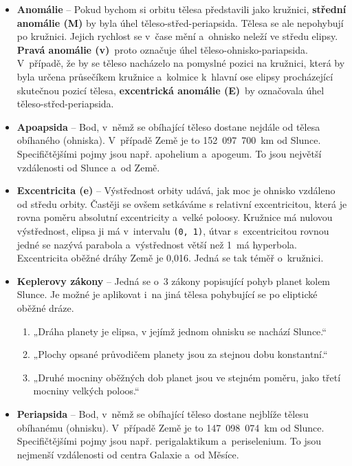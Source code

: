 \documentclass[a4paper,12pt]{article}
\def\code#1{\texttt{#1}}
\begin{document}

\begin{itemize}
\item \textbf{Anomálie} -- Pokud bychom si orbitu tělesa představili jako kružnici, \textbf{střední anomálie (M)} by byla úhel těleso-střed-periapsida. Tělesa se ale nepohybují po kružnici. Jejich rychlost se v~čase mění a~ohnisko neleží ve středu elipsy. \textbf{Pravá anomálie (v)}~proto označuje úhel těleso-ohnisko-pariapsida. V~případě, že by se těleso nacházelo na pomyslné pozici na kružnici, která by byla určena průsečíkem kružnice a~kolmice k~hlavní ose elipsy procházející skutečnou pozicí tělesa, \textbf{excentrická anomálie (E)}~by označovala úhel těleso-střed-periapsida.~\cite{kleczek}

\item \textbf{Apoapsida} -- Bod, v~němž se obíhající těleso dostane nejdále od tělesa obíhaného (ohniska). V~případě Země je to 152~097~700~km od Slunce. Specifičtějšími pojmy jsou např. apohelium a~apogeum. To jsou největší vzdálenosti od Slunce a~od Země.~\cite{kleczek}

\item \textbf{Excentricita (e)} -- Výstřednost orbity udává, jak moc je ohnisko vzdáleno od středu orbity. Častěji se ovšem setkáváme s relativní excentricitou, která je rovna poměru absolutní excentricity a~velké poloosy. Kružnice má nulovou výstřednost, elipsa ji má v~intervalu \code{(0,~1)}, útvar s~excentricitou rovnou jedné se nazývá parabola a~výstřednost větší než 1~má hyperbola. Excentricita oběžné dráhy Země je 0,016. Jedná se tak téměř o~kružnici.~\cite{kleczek}

\item \textbf{Keplerovy zákony} -- Jedná se o~3 zákony popisující pohyb planet kolem Slunce. Je možné je aplikovat i~na jiná tělesa pohybující se po eliptické oběžné dráze.~\cite{kleczek}

\begin{enumerate}
\item „Dráha planety je elipsa, v jejímž jednom ohnisku se nachází Slunce.“
\item „Plochy opsané průvodičem planety jsou za stejnou dobu konstantní.“
\item „Druhé mocniny oběžných dob planet jsou ve stejném poměru, jako třetí mocniny velkých poloos.“
\end{enumerate}

\item \textbf{Periapsida} -- Bod, v~němž se obíhající těleso dostane nejblíže tělesu obíhanému (ohnisku). V~případě Země je to 147~098~074~km od Slunce. Specifičtějšími pojmy jsou např. perigalaktikum a~periselenium. To jsou nejmenší vzdálenosti od centra Galaxie a~od Měsíce.~\cite{kleczek}


\end{itemize}
\end{document}
